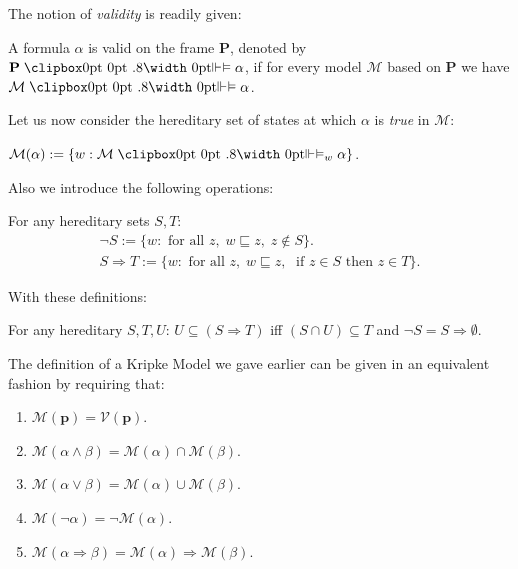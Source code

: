 	The notion of \emph{validity} is readily given:
	
	\begin{definition}
		A formula $\alpha$ is valid on the frame \textbf{P}, denoted by $\textbf{P} \VDashA \alpha$, if for every model $\mathcal{M}$ based on \textbf{P} we have $\mathcal{M} \VDashA \alpha$. 
	\end{definition}
	
	Let us now consider the hereditary set of states at which $\alpha$ is \emph{true} in $\mathcal{M}$:
	
	\begin{definition}
		$\mathcal{M}(\alpha) := \{ w : \mathcal{M} \VDashA_w \alpha\}$.
	\end{definition} 
	
	Also we introduce the following operations:  
	\begin{definition}
		For any hereditary sets $S,  T$:
	\begin{gather*}
		\neg S := \{w: \text{ for all } z, \; w \sqsubseteq z, \; z \notin S\}. \\
		S \Rightarrow T := \{ w: \text{ for all } z, \; w \sqsubseteq z, \;\text{ if } z \in S \text{ then } z \in T \}.
	\end{gather*}	
	\end{definition}
	
	
	With these definitions: 
	\begin{prop}
		For any hereditary $S,T,U$: \newline
		$ U \subseteq (S \Rightarrow T) $ iff $ (S \cap U) \subseteq T $ and
		$\neg S = S \Rightarrow \emptyset$.
	\end{prop}
	
	The definition of a Kripke Model we gave earlier can be given in an equivalent fashion by requiring that:
	
	\begin{enumerate}[label=(\roman*)]
		\item $\mathcal{M}(\textbf{p}) = \mathcal{V}(\textbf{p})$.
		\item $\mathcal{M}(\alpha \land \beta) = \mathcal{M}(\alpha) \cap \mathcal{M}(\beta)$.
		\item $\mathcal{M}(\alpha \lor \beta) = \mathcal{M}(\alpha) \cup \mathcal{M}(\beta)$.
		\item $\mathcal{M}(\neg\alpha) = \neg\mathcal{M}(\alpha)$.
		\item $\mathcal{M}(\alpha \Rightarrow \beta) = \mathcal{M}(\alpha) \Rightarrow \mathcal{M}(\beta)$.
	\end{enumerate}
	
